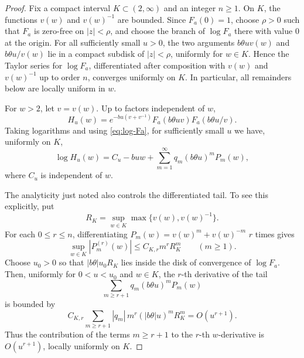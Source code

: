 ﻿\documentclass[preprint,12pt,authoryear]{elsarticle}
\begin{document}
\begin{proof}
Fix a compact interval \(K\subset(2,\infty)\) and an integer \(n\ge1\).  On \(K\), the functions \(v(w)\) and \(v(w)^{-1}\) are bounded.  Since \(F_a(0)=1\), choose \(\rho>0\) such that \(F_a\) is zero-free on \(|z|<\rho\), and choose the branch of \(\log F_a\) there with value \(0\) at the origin.  For all sufficiently small \(u>0\), the two arguments \(b\theta uv(w)\) and \(b\theta u/v(w)\) lie in a compact subdisk of \(|z|<\rho\), uniformly for \(w\in K\).  Hence the Taylor series for \(\log F_a\), differentiated after composition with \(v(w)\) and \(v(w)^{-1}\) up to order \(n\), converges uniformly on \(K\).  In particular, all remainders below are locally uniform in \(w\).

For \(w>2\), let \(v=v(w)\).  Up to factors independent of \(w\),
\begin{equation}
H_u(w)
=
e^{-bu(v+v^{-1})}
F_a(b\theta uv)F_a(b\theta u/v).
\end{equation}
Taking logarithms and using \eqref{eq:log-Fa}, for sufficiently small \(u\) we have, uniformly on \(K\),
\begin{equation}
\log H_u(w)
=
C_u-buw+
\sum_{m=1}^{\infty}q_m(b\theta u)^mP_m(w),
\end{equation}
where \(C_u\) is independent of \(w\).

The analyticity just noted also controls the differentiated tail.  To see this explicitly, put
\begin{equation}
R_K=\sup_{w\in K}\max\{v(w),v(w)^{-1}\}.
\end{equation}
For each \(0\le r\le n\), differentiating \(P_m(w)=v(w)^m+v(w)^{-m}\) \(r\) times gives
\begin{equation}
\sup_{w\in K}|P_m^{(r)}(w)|
\le C_{K,r}m^rR_K^m
\qquad(m\ge1).
\end{equation}
Choose \(u_0>0\) so that \(|b\theta|u_0R_K\) lies inside the disk of convergence of \(\log F_a\).  Then, uniformly for \(0<u<u_0\) and \(w\in K\), the \(r\)-th derivative of the tail
\begin{equation}
\sum_{m\ge r+1}q_m(b\theta u)^mP_m(w)
\end{equation}
is bounded by
\begin{equation}
C_{K,r}\sum_{m\ge r+1}|q_m|\,m^r(|b\theta|u)^mR_K^m
=O(u^{r+1}).
\end{equation}
Thus the contribution of the terms \(m\ge r+1\) to the \(r\)-th \(w\)-derivative is \(O(u^{r+1})\), locally uniformly on \(K\).


\end{proof}
\end{document}
